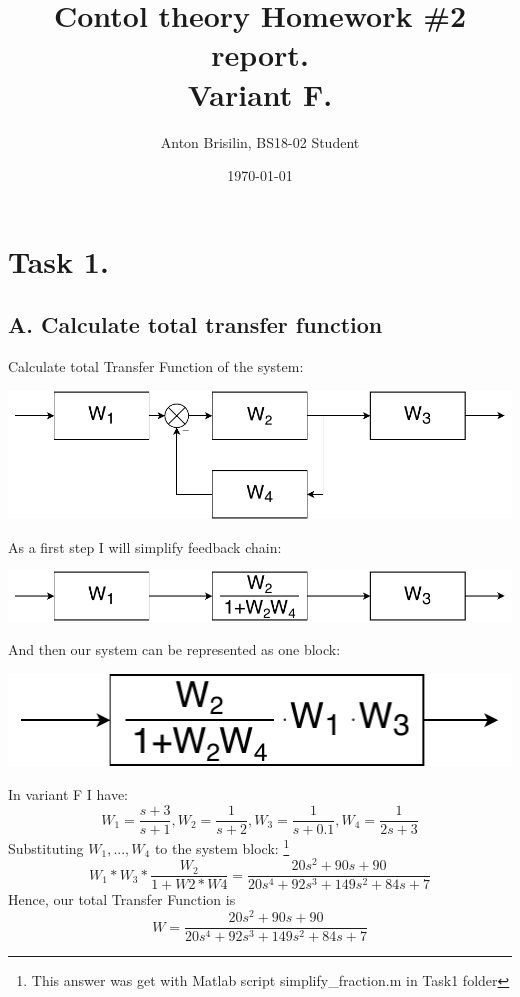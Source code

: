 \documentclass[a4paper,12pt]{article}
\title{Contol theory Homework \#2 report.\\Variant F.}
\author{Anton Brisilin, BS18-02 Student}
\date{\today}
\begin{document}
\maketitle
\section{Task 1.}
\subsection*{A. Calculate total transfer function}
    Calculate total Transfer Function of the system:
    \begin{center}
        \includegraphics[width=\linewidth/2]{../Task1/ToReport/T1Step0.pdf}
    \end{center}
    As a first step I will simplify feedback chain:
    \begin{center}
        \includegraphics[width=\linewidth/2]{../Task1/ToReport/T1Step1.pdf}
    \end{center}
    And then our system can be represented as one block:
    \begin{center}
        \includegraphics[width=\linewidth/4]{../Task1/ToReport/T1Step2.pdf}
    \end{center}
    In variant F I have:
    \begin{equation*}
    W_1 = \frac{s+3}{s+1}, W_2 = \frac{1}{s+2}, 
    W_3 = \frac{1}{s+0.1}, W_4 = \frac{1}{2s+3}
    \end{equation*}
    Substituting $W_1, ... ,W_4$ to the system block:
    \footnote{This answer was get with Matlab script simplify\_fraction.m in Task1 folder}
    \begin{equation*}
    W_1 * W_3 * \frac{W_2}{1+W2*W4} = 
    \frac{20s^2 + 90s + 90}{20s^4 + 92s^3 + 149s^2 + 84s + 7}
    \end{equation*}
    Hence, our total Transfer Function is 
    \begin{equation}
        W = \frac{20s^2 + 90s + 90}{20s^4 + 92s^3 + 149s^2 + 84s + 7}
    \end{equation}
\end{document}
